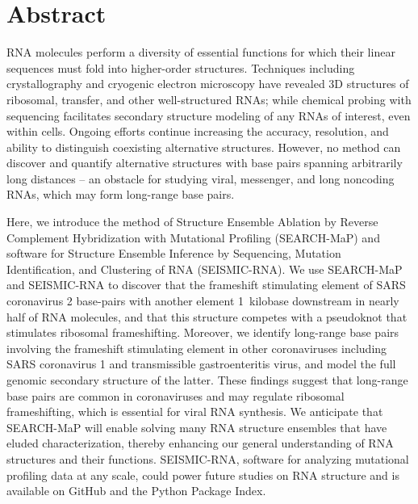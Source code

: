 \documentclass[main.tex]{subfiles}
\begin{document}
\section{Abstract}

RNA molecules perform a diversity of essential functions for which their linear sequences must fold into higher-order structures.
Techniques including crystallography and cryogenic electron microscopy have revealed 3D structures of ribosomal, transfer, and other well-structured RNAs; while chemical probing with sequencing facilitates secondary structure modeling of any RNAs of interest, even within cells.
Ongoing efforts continue increasing the accuracy, resolution, and ability to distinguish coexisting alternative structures.
However, no method can discover and quantify alternative structures with base pairs spanning arbitrarily long distances -- an obstacle for studying viral, messenger, and long noncoding RNAs, which may form long-range base pairs.

Here, we introduce the method of Structure Ensemble Ablation by Reverse Complement Hybridization with Mutational Profiling (SEARCH-MaP) and software for Structure Ensemble Inference by Sequencing, Mutation Identification, and Clustering of RNA (SEISMIC-RNA).
We use SEARCH-MaP and SEISMIC-RNA to discover that the frameshift stimulating element of SARS coronavirus 2 base-pairs with another element 1~kilobase downstream in nearly half of RNA molecules, and that this structure competes with a pseudoknot that stimulates ribosomal frameshifting.
Moreover, we identify long-range base pairs involving the frameshift stimulating element in other coronaviruses including SARS coronavirus 1 and transmissible gastroenteritis virus, and model the full genomic secondary structure of the latter.
These findings suggest that long-range base pairs are common in coronaviruses and may regulate ribosomal frameshifting, which is essential for viral RNA synthesis.
We anticipate that SEARCH-MaP will enable solving many RNA structure ensembles that have eluded characterization, thereby enhancing our general understanding of RNA structures and their functions.
SEISMIC-RNA, software for analyzing mutational profiling data at any scale, could power future studies on RNA structure and is available on GitHub and the Python Package Index.
\end{document}
